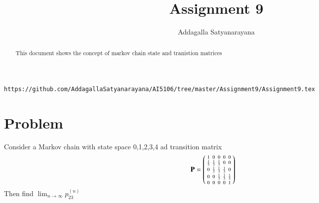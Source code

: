 \documentclass[journal,12pt,twocolumn]{IEEEtran}
\begin{document}
	\makeatother
	\let\StandardTheFigure\thefigure
	\let\vec\mathbf
	\renewcommand{\thefigure}{\theproblem}
	\def\putbox#1#2#3{\makebox[0in][l]{\makebox[#1][l]{}\raisebox{\baselineskip}[0in][0in]{\raisebox{#2}[0in][0in]{#3}}}}
	\def\rightbox#1{\makebox[0in][r]{#1}}
	\def\centbox#1{\makebox[0in]{#1}}
	\def\topbox#1{\raisebox{-\baselineskip}[0in][0in]{#1}}
	\def\midbox#1{\raisebox{-0.5\baselineskip}[0in][0in]{#1}}
	\vspace{3cm}
	\title{Assignment 9}
	\author{Addagalla Satyanarayana}
	\maketitle
	\newpage
	\bigskip
	\renewcommand{\thefigure}{\theenumi}
	\renewcommand{\thetable}{\theenumi}
\begin{abstract}
This document shows the concept of markov chain state and tranistion matrices
\end{abstract}

%
\begin{lstlisting}
https://github.com/AddagallaSatyanarayana/AI5106/tree/master/Assignment9/Assignment9.tex
\end{lstlisting}
%
\section{Problem}
	Consider a Markov chain with state space {0,1,2,3,4} ad transition matrix 
\begin{align}
\vec{P}&=\myvec{1&0&0&0&0\\\frac{1}{3}&\frac{1}{3}&\frac{1}{3}&0&0\\0 &\frac{1}{3}&\frac{1}{3}&\frac{1}{3}&0\\0&0&\frac{1}{3}&\frac{1}{3}&\frac{1}{3}\\0&0&0&0&1}\label{eq:Problem}
\end{align}
Then find $\lim_{n \to \infty} p_{23}^{(n)}$
\end{document}

